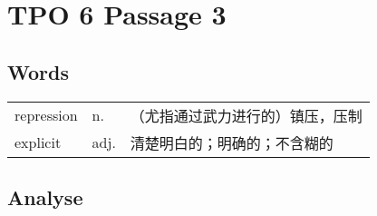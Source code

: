\section{TPO 6 Passage 3}

\subsection{Words}

\begin{tabular}{lll}
    repression & n.   & （尤指通过武力进行的）镇压，压制 \\
    explicit   & adj. & 清楚明白的；明确的；不含糊的   \\
\end{tabular}

\subsection{Analyse}

